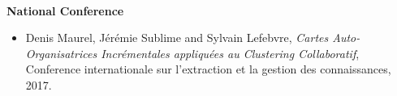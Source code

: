 \textbf{\\National Conference}

\begin{itemize}
    \item Denis Maurel, J{\'e}r{\'e}mie Sublime and Sylvain Lefebvre,
        \textit{Cartes Auto-Organisatrices Incrémentales appliquées au Clustering Collaboratif},
        Conf{e}rence internationale sur l'extraction et la gestion des connaissances,
        2017.
\end{itemize}

